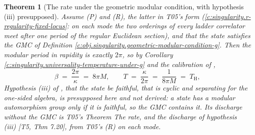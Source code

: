 \documentclass[11pt]{article}
\newtheorem{theorem}{Theorem}[section]
\theoremstyle{definition}
\theoremstyle{plain}
\providecommand{\TH}{}\renewcommand{\TH}{T_{\mathrm{H}}}
\begin{document}
\begin{theorem}[The rate under the geometric modular condition, with hypothesis (iii) presupposed]\label{c:state-selection.rate-discharge-hypothesis-iii}
Assume (P) and (R), the latter in T05's form (\ref{c:singularity.r-regularity-fixed-locus}: on each mode the two orderings of every ladder correlator meet after one period of the regular Euclidean section), and that the state satisfies the GMC of Definition \ref{c:obj.singularity.geometric-modular-condition-g}. Then the modular period in rapidity is exactly $2\pi$, so by Corollary \ref{c:singularity.universality-temperature-under-g} and the calibration of \cite[Prop.~6.2]{ButlerT5},
\[
\beta \;=\; \frac{2\pi}{\kappa} \;=\; 8\pi M , \qquad T \;=\; \frac{\kappa}{2\pi} \;=\; \frac{1}{8\pi M} \;=\; \TH ,
\]
Hypothesis (iii) of \cite[Thm.~7.3]{ButlerT5}, that the state be faithful, that is cyclic and separating for the one-sided algebra, is presupposed here and not derived: a state has a modular automorphism group only if it is faithful, so the GMC contains it. Its discharge without the GMC is T05's Theorem \emph{The rate, and the discharge of hypothesis (iii)} [T5, Thm 7.20], from T05's (R) on each mode.
\end{theorem}
\end{document}
